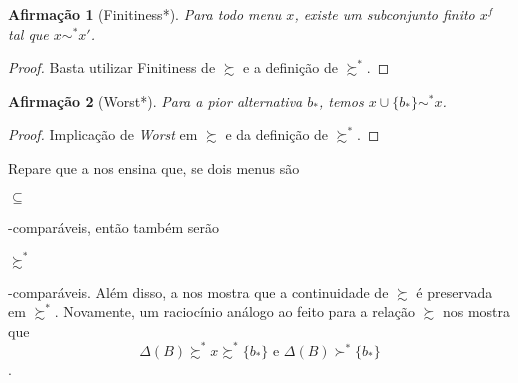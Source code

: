 \documentclass[12pt, a4paper]{article}
\theoremstyle{nonumberplain}
\newtheorem{proof}{Dem.}
\theoremstyle{plain}
\theoremstyle{plain}
\newtheorem{claim}{Afirmação}
\theoremstyle{plain}
\theoremstyle{nonumberplain}
\begin{document}
\begin{claim}[Finitiness*]Para todo menu $x$, existe um subconjunto finito $x^f$ tal que $x\sim^* x'$.\end{claim}
\begin{proof}
Basta utilizar Finitiness de $\succsim$ e a definição de $\succsim^*$.
\end{proof}
\begin{claim}[Worst*] Para a pior alternativa $b_*$, temos $x\cup\{b_*\}\sim^* x$.\end{claim}
\begin{proof}
Implicação de \textit{Worst} em $\succsim$ e da definição de $\succsim^*$.
\end{proof}

Repare que a  nos ensina que, se dois menus são \begin{small}$\subseteq$\end{small}-comparáveis, então também serão \begin{small}$\succsim^*$\end{small}-comparáveis. Além disso, a  nos mostra que a continuidade de $\succsim$ é preservada em $\succsim^*$. Novamente, um raciocínio análogo ao feito para a relação $\succsim$ nos mostra que \[\Delta(B)\succsim^* x\succsim^* \{b_*\} \text{ e } \Delta(B)\succ^* \{b_*\}\].
\end{document}
